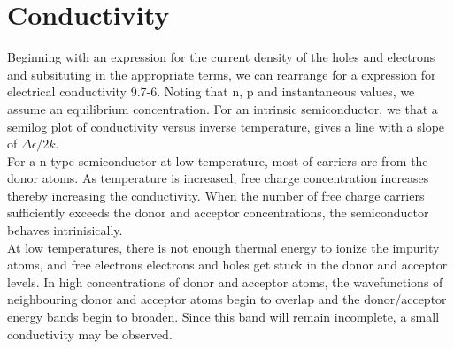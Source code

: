 \documentclass{article}
\numberwithin{equation}{section}
\begin{document}
\section*{Conductivity} Beginning with an expression for the current density of the holes and electrons and subsituting in the appropriate terms, we can rearrange for a expression for electrical conductivity 9.7-6. Noting that n, p and instantaneous values, we assume an equilibrium concentration. For an intrinsic semiconductor, we that a semilog plot of conductivity versus inverse temperature, gives a line with a slope of $\Delta \epsilon/2k$.\\
For a n-type semiconductor at low temperature, most of carriers are from the donor atoms. As temperature is increased, free charge concentration increases thereby increasing the conductivity. When the number of free charge carriers sufficiently exceeds the donor and acceptor concentrations, the semiconductor behaves intrinisically.\\
At low temperatures, there is not enough thermal energy to ionize the impurity atoms, and free electrons electrons and holes get stuck in the donor and acceptor levels. In high concentrations of donor and acceptor atoms, the wavefunctions of neighbouring donor and acceptor atoms begin to overlap and the donor/acceptor energy bands begin to broaden. Since this band will remain incomplete, a small conductivity may be observed.\\  
\end{document}
